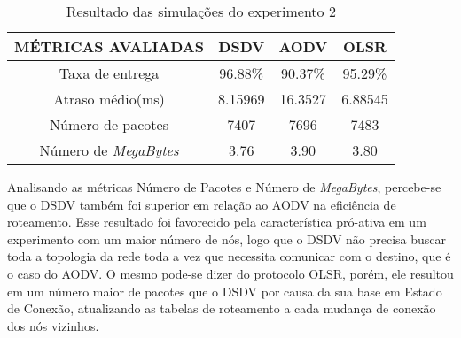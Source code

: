\begin{table}[H]
	\centering
	\caption{Resultado das simula\c{c}\~oes do experimento 2}
	\begin{tabular}{ | c | c | c | c | }
		\hline
		M\'ETRICAS AVALIADAS & DSDV & AODV & OLSR \\ \hline
		Taxa de entrega & 96.88\% & 90.37\% & 95.29\%  \\ \hline
		Atraso m\'edio(ms) & 8.15969 & 16.3527 & 6.88545  \\ \hline
		N\'umero de pacotes & 7407 & 7696 & 7483  \\ \hline
		N\'umero de \textit{MegaBytes} & 3.76 & 3.90 & 3.80  \\ \hline
	\end{tabular}
	\label{tabExp2Result}
\end{table}

Analisando as m\'etricas N\'umero de Pacotes e N\'umero de \textit{MegaBytes}, percebe-se que o DSDV tamb\'em foi superior em rela\c{c}\~ao ao AODV na efici\^encia de roteamento.
Esse resultado foi favorecido pela caracter\'istica pr\'o-ativa em um experimento com um maior n\'umero de n\'os, logo que o DSDV n\~ao precisa buscar toda a topologia da rede toda a vez que necessita comunicar com o destino, que \'e o caso do AODV. 
O mesmo pode-se dizer do protocolo OLSR, por\'em, ele resultou em um n\'umero maior de pacotes que o DSDV por causa da sua base em Estado de Conex\~ao, atualizando as tabelas de roteamento a cada mudan\c{c}a de conex\~ao dos n\'os vizinhos.


